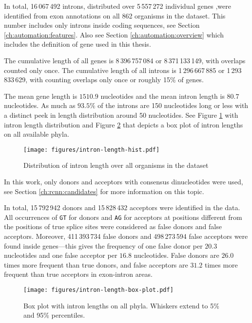 In total, 16\,067\,492 introns, distributed over 5\,557\,272 individual genes
,were identified from exon annotations on all 862 organisms in the dataset.
This number includes only introns inside coding sequences, see Section
\ref{ch:automation:features}. Also see Section \ref{ch:automation:overview}
which includes the definition of gene used in this thesis.

The cumulative length of all genes is 8\,396\,757\,084 or 8\,371\,133\,149,
with overlaps counted only once. The cumulative length of all introns is
1\,296\,667\,885 or 1\,293\,833\,629, with counting overlaps only once or
roughly 15\% of genes.

The mean gene length is $1510.9$ nucleotides and the mean intron length is
$80.7$ nucleotides. As much as $93.5\%$ of the introns are 150 nucleotides long
or less with a distinct peek in length distribution around 50 nucleotides. See
Figure \ref{fig:data:intron-len-dist} with intron length distribution and
Figure \ref{fig:data:intron-len-box-plot} that depicts a box plot of intron
lengths on all available phyla.

\begin{figure}
  \centering
  \texttt{[image: figures/intron-length-hist.pdf]}
  \caption{Distribution of intron length over all organisms in the dataset}
  \label{fig:data:intron-len-dist}
\end{figure}

In this work, only donors and acceptors with consensus dinucleotides were used,
see Section \ref{ch:rcnn:candidates} for more information on this topic.

In total, 15\,792\,942 donors and 15\,828\,432 acceptors were identified in the
data. All occurrences of \Verb_GT_ for donors and \Verb_AG_ for acceptors at
positions different from the positions of true splice sites were considered as
false donors and false acceptors. Moreover, 411\,393\,734 false donors and
498\,273\,594 false acceptors were found inside genes---this gives the
frequency of one false donor per $20.3$ nucleotides and one false acceptor per
$16.8$ nucleotides. False donors are $26.0$ times more frequent than true
donors, and false acceptors are $31.2$ times more frequent than true acceptors
in exon-intron areas.

\begin{figure}
  \centering
  \texttt{[image: figures/intron-length-box-plot.pdf]}
  \caption{Box plot with intron lengths on all phyla. Whiskers extend to 5\%
    and 95\% percentiles.}
  \label{fig:data:intron-len-box-plot}
\end{figure}
